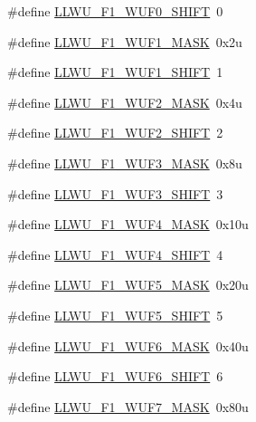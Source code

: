 \begin{DoxyCompactItemize}
\#define \hyperlink{group___l_l_w_u___register___masks_ga6a004e1e5a54356cf5b70d9f17b96afc}{L\+L\+W\+U\+\_\+\+F1\+\_\+\+W\+U\+F0\+\_\+\+S\+H\+I\+FT}~0
\item 
\#define \hyperlink{group___l_l_w_u___register___masks_ga3513d59cf672e1dfd8884672b57c879b}{L\+L\+W\+U\+\_\+\+F1\+\_\+\+W\+U\+F1\+\_\+\+M\+A\+SK}~0x2u
\item 
\#define \hyperlink{group___l_l_w_u___register___masks_gadfac3bafc6a624b27f059e3d9cf3a899}{L\+L\+W\+U\+\_\+\+F1\+\_\+\+W\+U\+F1\+\_\+\+S\+H\+I\+FT}~1
\item 
\#define \hyperlink{group___l_l_w_u___register___masks_gabc46629018d0f2eb7a39896eb5225933}{L\+L\+W\+U\+\_\+\+F1\+\_\+\+W\+U\+F2\+\_\+\+M\+A\+SK}~0x4u
\item 
\#define \hyperlink{group___l_l_w_u___register___masks_gab99e1778fd26ccd69f31a56d94709e41}{L\+L\+W\+U\+\_\+\+F1\+\_\+\+W\+U\+F2\+\_\+\+S\+H\+I\+FT}~2
\item 
\#define \hyperlink{group___l_l_w_u___register___masks_ga7c81d1a3309d56f967355042ac08c299}{L\+L\+W\+U\+\_\+\+F1\+\_\+\+W\+U\+F3\+\_\+\+M\+A\+SK}~0x8u
\item 
\#define \hyperlink{group___l_l_w_u___register___masks_gada64305bc36dde8d293f511de2183d0c}{L\+L\+W\+U\+\_\+\+F1\+\_\+\+W\+U\+F3\+\_\+\+S\+H\+I\+FT}~3
\item 
\#define \hyperlink{group___l_l_w_u___register___masks_ga9dad2dc81874baa09dac37d10cc4781d}{L\+L\+W\+U\+\_\+\+F1\+\_\+\+W\+U\+F4\+\_\+\+M\+A\+SK}~0x10u
\item 
\#define \hyperlink{group___l_l_w_u___register___masks_ga4ce65dd6db7f89bd5e6f0fb7df47a399}{L\+L\+W\+U\+\_\+\+F1\+\_\+\+W\+U\+F4\+\_\+\+S\+H\+I\+FT}~4
\item 
\#define \hyperlink{group___l_l_w_u___register___masks_ga2ba67283979e853e1601bd15a534523e}{L\+L\+W\+U\+\_\+\+F1\+\_\+\+W\+U\+F5\+\_\+\+M\+A\+SK}~0x20u
\item 
\#define \hyperlink{group___l_l_w_u___register___masks_ga56f1fa2e4a277de750be421a3b35df87}{L\+L\+W\+U\+\_\+\+F1\+\_\+\+W\+U\+F5\+\_\+\+S\+H\+I\+FT}~5
\item 
\#define \hyperlink{group___l_l_w_u___register___masks_ga25c6fc1f914e4e6cdc9863e9910a7a18}{L\+L\+W\+U\+\_\+\+F1\+\_\+\+W\+U\+F6\+\_\+\+M\+A\+SK}~0x40u
\item 
\#define \hyperlink{group___l_l_w_u___register___masks_gadc6ba47e215a21859a0cdb07637e3720}{L\+L\+W\+U\+\_\+\+F1\+\_\+\+W\+U\+F6\+\_\+\+S\+H\+I\+FT}~6
\item 
\#define \hyperlink{group___l_l_w_u___register___masks_ga085396c6707e1233072318b9f791a179}{L\+L\+W\+U\+\_\+\+F1\+\_\+\+W\+U\+F7\+\_\+\+M\+A\+SK}~0x80u

\end{DoxyCompactItemize}

